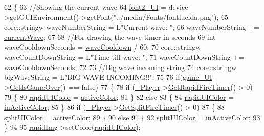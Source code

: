 \begin{DoxyCode}
62 \{
63     \textcolor{comment}{//Showing the current wave}
64     \hyperlink{_u_i_system_8cpp_ada6b9907ce29ba6326347751450d127c}{font2\_UI} = device->getGUIEnvironment()->getFont(\textcolor{stringliteral}{"../media/Fonts/fontlucida.png"});
65     core::stringw waveNumberString = L\textcolor{stringliteral}{"Current wave: "};
66     waveNumberString += \hyperlink{_enemy_spawner_8cpp_ae8875f134fe6fadbb9f14c149ef06d50}{currentWave};
67 
68     \textcolor{comment}{//For drawing the wave timer in seconds}
69     \textcolor{keywordtype}{int} waveCooldownSeconds = \hyperlink{_enemy_spawner_8cpp_a72775aa668ffb2a0d7e469173cdd5b93}{waveCooldown} / 60;
70     core::stringw waveCountDownString = L\textcolor{stringliteral}{"Time till wave: "};
71     waveCountDownString += waveCooldownSeconds;
72 
73     \textcolor{comment}{//Big wave incoming string}
74     core::stringw bigWaveString = L\textcolor{stringliteral}{"BIG WAVE INCOMING!!"};   
75 
76     \textcolor{keywordflow}{if}(\hyperlink{_u_i_system_8cpp_abae6af8ee586e9cd14e611834ab165aa}{game\_UI}->\hyperlink{class_game_a472e76af50d5275142522f9a5e149ab1}{GetIsGameOver}() == \textcolor{keyword}{false})
77     \{
78         \textcolor{keywordflow}{if} (\hyperlink{_u_i_system_8cpp_a9c58733c8e7a9eda66d170719b6b0c49}{\_Player}->\hyperlink{class_player_ad81495e13d7c65f0ea090a9144e11d61}{GetRapidFireTimer}() > 0)
79         \{
80             \hyperlink{_u_i_system_8cpp_a88a8ca6d36ecd20e691425c3a4d1a258}{rapidUIColor} = \hyperlink{_u_i_system_8cpp_a121d3bbe4a7796e9e7de661df324410e}{activeColor};
81         \}
82         \textcolor{keywordflow}{else}
83         \{
84             \hyperlink{_u_i_system_8cpp_a88a8ca6d36ecd20e691425c3a4d1a258}{rapidUIColor} = \hyperlink{_u_i_system_8cpp_a5a3b6321e5b7bbd239d3917d272f26a1}{inActiveColor};
85         \}
86         \textcolor{keywordflow}{if} (\hyperlink{_u_i_system_8cpp_a9c58733c8e7a9eda66d170719b6b0c49}{\_Player}->\hyperlink{class_player_a6b5c6e5353331ab55bfd440ea9f8f9bf}{GetSplitFireTimer}() > 0)
87         \{
88             \hyperlink{_u_i_system_8cpp_ac142a7d664627b15adf335194b223699}{splitUIColor} = \hyperlink{_u_i_system_8cpp_a121d3bbe4a7796e9e7de661df324410e}{activeColor};
89         \}
90         \textcolor{keywordflow}{else}
91         \{
92             \hyperlink{_u_i_system_8cpp_ac142a7d664627b15adf335194b223699}{splitUIColor} = \hyperlink{_u_i_system_8cpp_a5a3b6321e5b7bbd239d3917d272f26a1}{inActiveColor};
93         \}
94 
95         \hyperlink{_u_i_system_8cpp_a92eab4763472751813af170dd4f9fb2f}{rapidImg}->setColor(\hyperlink{_u_i_system_8cpp_a88a8ca6d36ecd20e691425c3a4d1a258}{rapidUIColor});

\end{DoxyCode}
